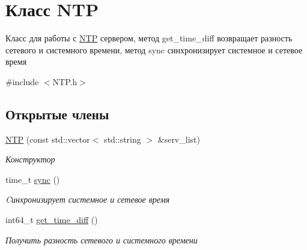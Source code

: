 \hypertarget{classNTP}{}\section{Класс N\+TP}
\label{classNTP}


Класс для работы с \mbox{\hyperlink{classNTP}{N\+TP}} сервером, метод get\+\_\+time\+\_\+diff возвращает разность сетевого и системного времени, метод sync синхронизирует системное и сетевое время  




{\ttfamily \#include $<$N\+T\+P.\+h$>$}

\subsection*{Открытые члены}
\begin{DoxyCompactItemize}
\item 
\mbox{\hyperlink{classNTP_ad652f28e14fe994f0389985c56f069ed}{N\+TP}} (const std\+::vector$<$ std\+::string $>$ \&serv\+\_\+list)
\begin{DoxyCompactList}\small\item\em Конструктор \end{DoxyCompactList}\item 
time\+\_\+t \mbox{\hyperlink{classNTP_a5ac9726537b663175fe6487716efc4c7}{sync}} ()
\begin{DoxyCompactList}\small\item\em Cинхронизирует системное и сетевое время \end{DoxyCompactList}\item 
int64\+\_\+t \mbox{\hyperlink{classNTP_aadb62dc7f48a7fb76e1ec9d1784e657c}{get\+\_\+time\+\_\+diff}} ()
\begin{DoxyCompactList}\small\item\em Получить разность сетевого и системного времени \end{DoxyCompactList}\end{DoxyCompactItemize}
